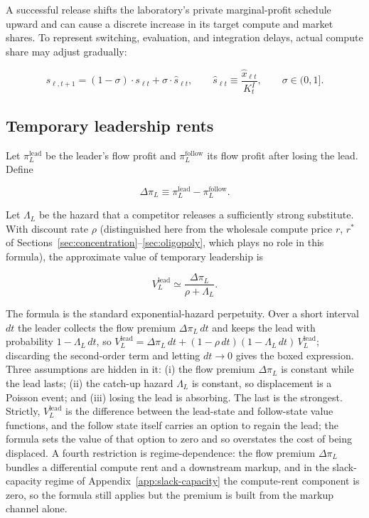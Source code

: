\documentclass[11pt]{article}
\begin{document}
A successful release shifts the laboratory's private marginal-profit schedule upward and can cause a discrete increase in its target compute and market shares. To represent switching, evaluation, and integration delays, actual compute share may adjust gradually:

\begin{equation}s_{\ell,t+1}=\left(1-\sigma\right)\cdot s_{\ell t}+\sigma\cdot\widehat s_{\ell t},\qquad \widehat s_{\ell t}\equiv\frac{\widehat x_{\ell t}}{K_t^I},\qquad \sigma\in(0,1].\end{equation}

\subsection{Temporary leadership rents}

Let $\pi_L^{\mathrm{lead}}$ be the leader's flow profit and $\pi_L^{\mathrm{follow}}$ its flow profit after losing the lead. Define

\begin{equation}\Delta\pi_L\equiv\pi_L^{\mathrm{lead}}-\pi_L^{\mathrm{follow}}.\end{equation}

Let $\Lambda_L$ be the hazard that a competitor releases a sufficiently strong substitute. With discount rate $\rho$ (distinguished here from the wholesale compute price $r$, $r^*$ of Sections~\ref{sec:concentration}--\ref{sec:oligopoly}, which plays no role in this formula), the approximate value of temporary leadership is

\begin{equation}\boxed{V_L^{\mathrm{lead}}\simeq\frac{\Delta\pi_L}{\rho+\Lambda_L}.}\end{equation}

The formula is the standard exponential-hazard perpetuity. Over a short interval $dt$ the leader collects the flow premium $\Delta\pi_L\,dt$ and keeps the lead with probability $1-\Lambda_L\,dt$, so $V_L^{\mathrm{lead}}=\Delta\pi_L\,dt+(1-\rho\,dt)(1-\Lambda_L\,dt)\,V_L^{\mathrm{lead}}$; discarding the second-order term and letting $dt\to0$ gives the boxed expression. Three assumptions are hidden in it: (i) the flow premium $\Delta\pi_L$ is constant while the lead lasts; (ii) the catch-up hazard $\Lambda_L$ is constant, so displacement is a Poisson event; and (iii) losing the lead is absorbing. The last is the strongest. Strictly, $V_L^{\mathrm{lead}}$ is the difference between the lead-state and follow-state value functions, and the follow state itself carries an option to regain the lead; the formula sets the value of that option to zero and so overstates the cost of being displaced. A fourth restriction is regime-dependence: the flow premium $\Delta\pi_L$ bundles a differential compute rent and a downstream markup, and in the slack-capacity regime of Appendix~\ref{app:slack-capacity} the compute-rent component is zero, so the formula still applies but the premium is built from the markup channel alone.
\end{document}
